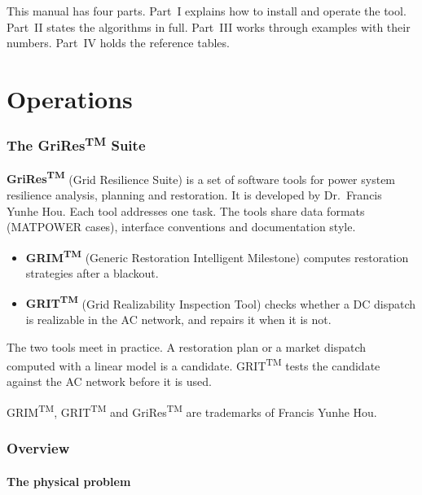 \documentclass[a4paper,11pt]{article}
\newcommand{\TM}{\textsuperscript{TM}}
\newcommand{\GRIM}{GRIM\TM}
\newcommand{\GRIT}{GRIT\TM}
\begin{document}
This manual has four parts. Part~I explains how to install and operate the tool. Part~II states the algorithms in full. Part~III works through examples with their numbers. Part~IV holds the reference tables.

\endgroup

\part{Operations}\label{part:operations}

\clearpage
\section{The GriRes\texorpdfstring{\TM}{(TM)} Suite}\label{sec:grires}

\textbf{GriRes\TM} (Grid Resilience Suite) is a set of software tools for power system resilience analysis, planning and restoration. It is developed by Dr.\ Francis Yunhe Hou. Each tool addresses one task. The tools share data formats (MATPOWER cases), interface conventions and documentation style.

\begin{itemize}[nosep]
  \item \textbf{\GRIM} (Generic Restoration Intelligent Milestone) computes restoration strategies after a blackout.
  \item \textbf{\GRIT} (Grid Realizability Inspection Tool) checks whether a DC dispatch is realizable in the AC network, and repairs it when it is not.
\end{itemize}

The two tools meet in practice. A restoration plan or a market dispatch computed with a linear model is a candidate. \GRIT{} tests the candidate against the AC network before it is used.

GRIM\TM, GRIT\TM{} and GriRes\TM{} are trademarks of Francis Yunhe Hou.

\section{Overview}\label{sec:overview}

\subsection{The physical problem}\label{sec:physics}
\end{document}
